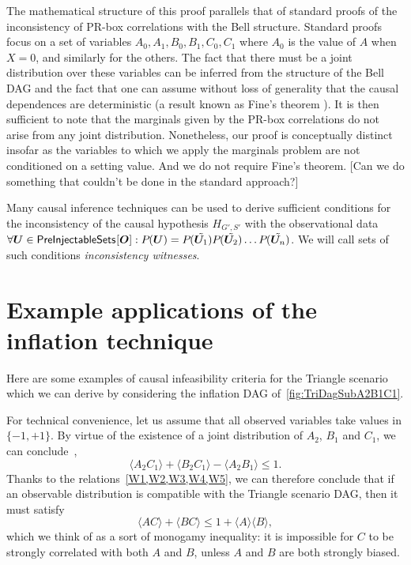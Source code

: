The mathematical structure of this proof parallels that of standard proofs of the inconsistency of PR-box correlations with the Bell structure.  Standard proofs focus on a set of variables $A_0, A_1, B_0, B_1, C_0, C_1$ where $A_0$  is the value of $A$ when $X=0$, and similarly for the others.  The fact that there must be a joint distribution over these variables can be inferred from the structure of the Bell DAG and the fact that one can assume without loss of generality that the causal dependences are deterministic (a result known as Fine's theorem \cite{FineTheorem}).  It is then sufficient to note that the marginals given by the PR-box correlations do not arise from any joint distribution.  Nonetheless, our proof is conceptually distinct insofar as the variables to which we apply the marginals problem are not conditioned on a setting value.  And we do not require Fine's theorem.  [Can we do something that couldn't be done in the standard approach?]

Many causal inference techniques can be used to derive sufficient conditions for the inconsistency of the causal hypothesis $H_{G',S'}$ with the observational data $\forall \bm{U} \in {\operatorname{\mathsf{PreInjectableSets}}_{}}\lbrack\bm{O}\rbrack: {P_{}}\lparen\bm{U}\rparen = {P_{}}\lparen\tilde{\bm{U}_1}\rparen{P_{}}\lparen\tilde{\bm{U}_2}\rparen \dots {P_{}}\lparen\tilde{\bm{U}_n}\rparen$. We will call sets of such conditions {\em inconsistency witnesses}.  

\color{black}
\section{Example applications of the inflation technique}\label{sec:examplebaddistributions}

Here are some examples of causal infeasibility criteria for the Triangle scenario which we can derive by considering the inflation DAG of~\cref{fig:TriDagSubA2B1C1}.

For technical convenience, let us assume that all observed variables take values in $\{-1,+1\}$. By virtue of the existence of a joint distribution of $A_2$, $B_1$ and $C_1$, we can conclude~\cite{pitowsky_boole_1994,kellerer_marginal_1964,leggett_garg_1985,araujo_cycle_2013},
\[
	\langle A_2 C_1\rangle + \langle B_2 C_1 \rangle - \langle A_2 B_1 \rangle \leq 1.
\]
Thanks to the relations~\cref{W1,W2,W3,W4,W5}, we can therefore conclude that if an observable distribution is compatible with the Triangle scenario DAG, then it must satisfy
\begin{equation}
	\label{eq:polymonogamy}
	\langle A C\rangle + \langle B C\rangle \leq 1 + \langle A\rangle \langle B\rangle,
\end{equation}
which we think of as a sort of monogamy inequality: it is impossible for $C$ to be strongly correlated with both $A$ and $B$, unless $A$ and $B$ are both strongly biased.

